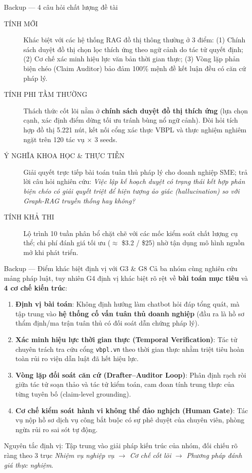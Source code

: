 \documentclass[aspectratio=169,10pt]{beamer}
\begin{document}
\begin{frame}{Backup --- 4 câu hỏi chất lượng đề tài}
\footnotesize
\begin{description}
  \item[TÍNH MỚI] Khác biệt với các hệ thống RAG đồ thị thông thường ở 3 điểm: (1) Chính sách duyệt đồ thị chọn lọc thích ứng theo ngữ cảnh do tác tử quyết định; (2) Cơ chế xác minh hiệu lực văn bản thời gian thực; (3) Vòng lặp phản biện chéo (Claim Auditor) bảo đảm 100\% mệnh đề kết luận đều có căn cứ pháp lý.
  \item[TÍNH PHI TẦM THƯỜNG] Thách thức cốt lõi nằm ở \textbf{chính sách duyệt đồ thị thích ứng} (lựa chọn cạnh, xác định điểm dừng tối ưu tránh bùng nổ ngữ cảnh). Đòi hỏi tích hợp đồ thị 5.221 nút, kết nối cổng xác thực VBPL và thực nghiệm nghiêm ngặt trên 120 tác vụ $\times$ 3 seeds.
  \item[Ý NGHĨA KHOA HỌC \& THỰC TIỄN] Giải quyết trực tiếp bài toán tuân thủ pháp lý cho doanh nghiệp SME; trả lời câu hỏi nghiên cứu: \emph{Việc lập kế hoạch duyệt có trạng thái kết hợp phản biện chéo có giải quyết triệt để hiện tượng ảo giác (hallucination) so với Graph-RAG truyền thống hay không?}
  \item[TÍNH KHẢ THI] Lộ trình 10 tuần phân bổ chặt chẽ với các mốc kiểm soát chất lượng cụ thể; chi phí đánh giá tối ưu ($\approx$ \$3.2 / \$25) nhờ tận dụng mô hình nguồn mở khi phát triển.
\end{description}
\end{frame}

\begin{frame}{Backup --- Điểm khác biệt định vị với G3 \& G8}
\footnotesize
Cả ba nhóm cùng nghiên cứu mảng pháp luật, tuy nhiên G4 định vị khác biệt rõ rệt về \textbf{bài toán mục tiêu} và \textbf{4 cơ chế kiến trúc}:
\vskip0.2cm
\begin{enumerate}
  \item \textbf{Định vị bài toán}: Không định hướng làm chatbot hỏi đáp tổng quát, mà tập trung vào \textbf{hệ thống cố vấn tuân thủ doanh nghiệp} (đầu ra là hồ sơ thẩm định/ma trận tuân thủ có đối soát dẫn chứng pháp lý).
  \item \textbf{Xác minh hiệu lực thời gian thực (Temporal Verification)}: Tác tử chuyên trách tra cứu cổng \texttt{vbpl.vn} theo thời gian thực nhằm triệt tiêu hoàn toàn rủi ro viện dẫn luật đã hết hiệu lực.
  \item \textbf{Vòng lặp đối soát căn cứ (Drafter--Auditor Loop)}: Phân định rạch ròi giữa tác tử soạn thảo và tác tử kiểm toán, cam đoan tính trung thực của từng tuyên bố (claim-level grounding).
  \item \textbf{Cơ chế kiểm soát hành vi không thể đảo nghịch (Human Gate)}: Tác vụ nộp hồ sơ dịch vụ công bắt buộc có sự phê duyệt của chuyên viên, phòng ngừa rủi ro sai sót tự động.
\end{enumerate}
\vskip0.25cm
{\scriptsize Nguyên tắc định vị: Tập trung vào giải pháp kiến trúc của nhóm, đối chiếu rõ ràng theo 3 trục \emph{Nhiệm vụ nghiệp vụ $\rightarrow$ Cơ chế cốt lõi $\rightarrow$ Phương pháp đánh giá thực nghiệm}.}
\end{frame}
\end{document}
